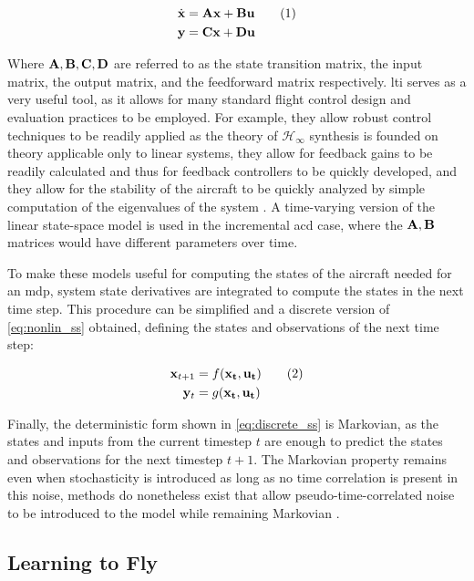 \documentclass[../report.tex]{subfiles}
\begin{document}
\begin{align*}
    \dot{\bold{x}} &= \bold{Ax} + \bold{Bu} \stepcounter{equation}\tag{\theequation}\label{eq:lin_ss}\\
    \bold{y} &= \bold{Cx} + \bold{Du} 
\end{align*}

Where $\bold{A, B, C, D}$ are referred to as the state transition matrix, the input matrix, the output matrix, and the feedforward matrix respectively. \ac{lti} serves as a very useful tool, as it allows for many standard flight control design and evaluation practices to be employed. For example, they allow robust control techniques to be readily applied as the theory of $\mathcal{H}_{\infty}$ synthesis is founded on theory applicable only to linear systems, they allow for feedback gains to be readily calculated and thus for feedback controllers to be quickly developed, and they allow for the stability of the aircraft to be quickly analyzed by simple computation of the eigenvalues of the system \cite{skogestad}. A time-varying version of the linear state-space model is used in the incremental \ac{acd} case, where the $\bold{A, B}$ matrices would have different parameters over time.

To make these models useful for computing the states of the aircraft needed for an \ac{mdp}, system state derivatives are integrated to compute the states in the next time step. This procedure can be simplified and a discrete version of \autoref{eq:nonlin_ss} obtained, defining the states and observations of the next time step:


\begin{align*}
    \bold{x}_{t+1} &= f(\bold{x_t, u_t}) \stepcounter{equation}\tag{\theequation}\label{eq:discrete_ss}\\
    \bold{y}_t &= g(\bold{x_t, u_t}) 
\end{align*}

Finally, the deterministic form shown in \autoref{eq:discrete_ss} is Markovian, as the states and inputs from the current timestep $t$ are enough to predict the states and observations for the next timestep $t+1$. The Markovian property remains even when stochasticity is introduced as long as no time correlation is present in this noise, methods do nonetheless exist that allow pseudo-time-correlated noise to be introduced to the model while remaining Markovian \cite{stochastic_forcing}.


\subsection{Learning to Fly}\label{subsec:learning_to_fly}
\end{document}
